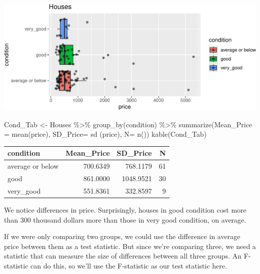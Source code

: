 \documentclass[
  letterpaper,
  DIV=11,
  numbers=noendperiod]{scrreprt}
\newenvironment{Shaded}{\begin{snugshade}}{\end{snugshade}}
\newcommand{\AttributeTok}[1]{\textcolor[rgb]{0.40,0.45,0.13}{#1}}
\newcommand{\FunctionTok}[1]{\textcolor[rgb]{0.28,0.35,0.67}{#1}}
\newcommand{\NormalTok}[1]{\textcolor[rgb]{0.00,0.23,0.31}{#1}}
\newcommand{\OtherTok}[1]{\textcolor[rgb]{0.00,0.23,0.31}{#1}}
\newcommand{\SpecialCharTok}[1]{\textcolor[rgb]{0.37,0.37,0.37}{#1}}
\begin{document}
\includegraphics{Ch3_files/figure-pdf/unnamed-chunk-229-1.pdf}

\begin{Shaded}
\begin{Highlighting}[]
\NormalTok{Cond\_Tab }\OtherTok{\textless{}{-}}\NormalTok{ Houses }\SpecialCharTok{\%\textgreater{}\%} \FunctionTok{group\_by}\NormalTok{(condition) }\SpecialCharTok{\%\textgreater{}\%} \FunctionTok{summarize}\NormalTok{(}\AttributeTok{Mean\_Price =} \FunctionTok{mean}\NormalTok{(price), }
                                             \AttributeTok{SD\_Price=} \FunctionTok{sd}\NormalTok{ (price), }
                                             \AttributeTok{N=} \FunctionTok{n}\NormalTok{())}
\FunctionTok{kable}\NormalTok{(Cond\_Tab)}
\end{Highlighting}
\end{Shaded}

\begin{longtable}[]{@{}lrrr@{}}
\toprule\noalign{}
condition & Mean\_Price & SD\_Price & N \\
\midrule\noalign{}
\endhead
\bottomrule\noalign{}
\endlastfoot
average or below & 700.6349 & 768.1179 & 61 \\
good & 861.0000 & 1048.9521 & 30 \\
very\_good & 551.8361 & 332.8597 & 9 \\
\end{longtable}

We notice differences in price. Surprisingly, houses in good condition
cost more than 300 thousand dollars more than those in very good
condition, on average.

If we were only comparing two groups, we could use the difference in
average price between them as a test statistic. But since we're
comparing three, we need a statistic that can measure the size of
differences between all three groups. An F-statistic can do this, so
we'll use the F-statistic as our test statistic here.
\end{document}
